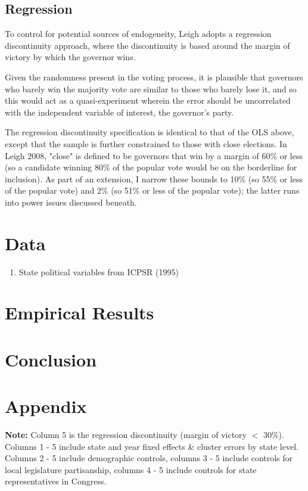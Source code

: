 \documentclass{article}
\begin{document}
\subsection{Regression}

To control for potential sources of endogeneity, Leigh adopts a regression discontinuity approach, where the discontinuity is based around the margin of victory by which the governor wins.

Given the randomness present in the voting process, it is plausible that governors who barely win the majority vote are similar to those who barely lose it, and so this would act as a quasi-experiment wherein the error should be uncorrelated with the independent variable of interest, the governor's party. 

The regression discontinuity specification is identical to that of the OLS above, except that the sample is further constrained to those with close elections. In Leigh 2008, "close" is defined to be governors that win by a margin of 60\% or less (so a candidate winning 80\% of the popular vote would be on the borderline for inclusion). As part of an extension, I narrow these bounds to 10\% (so 55\% or less of the popular vote) and 2\% (so 51\% or less of the popular vote); the latter runs into power issues discussed beneath.



\section{Data}

\begin{enumerate}
\item State political variables from ICPSR (1995)
\end{enumerate}

\section{Empirical Results}



\section{Conclusion}

\section{Appendix}


\textbf{Note:} Column 5 is the regression discontinuity (margin of victory $<$ 30\%). Columns 1 - 5 include state and year fixed effects \& cluster errors by state level. Columns 2 - 5 include demographic controls, columns 3 - 5 include controls for local legislature partisanship, columns 4 - 5 include controls for state representatives in Congress.
\end{document}
